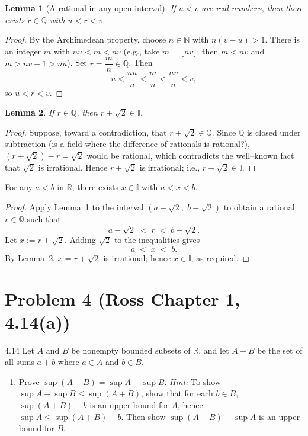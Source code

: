 \documentclass[12pt]{article}
\newtheorem{lemma}{Lemma}
\begin{document}
\begin{lemma}[A rational in any open interval]
\label{lem:densityQ}
If $u<v$ are real numbers, then there exists $r\in\mathbb{Q}$ with $u<r<v$.
\end{lemma}

\begin{proof}
By the Archimedean property, choose $n\in\mathbb{N}$ with $n(v-u)>1$.  
There is an integer $m$ with $nu<m<nv$ (e.g., take $m=\lfloor nv\rfloor$; then $m<nv$ and $m>nv-1>nu$).  
Set $r=\dfrac{m}{n}\in\mathbb{Q}$. Then
\[
u<\frac{nu}{n}<\frac{m}{n}<\frac{nv}{n}<v,
\]
so $u<r<v$.
\end{proof}

\begin{lemma}\label{lem:shift}
If $r\in\mathbb{Q}$, then $r+\sqrt2\in\mathbb{I}$.
\end{lemma}

\begin{proof}
Suppose, toward a contradiction, that $r+\sqrt2\in\mathbb{Q}$.  
Since $\mathbb{Q}$ is closed under subtraction (is a field where the difference of rationals is rational?), $(r+\sqrt2)-r=\sqrt2$ would be rational, which contradicts the well–known fact that $\sqrt2$ is irrational.  
Hence $r+\sqrt2$ is irrational; i.e., $r+\sqrt2\in\mathbb{I}$.
\end{proof}

For any $a<b$ in $\mathbb{R}$, there exists $x\in\mathbb{I}$ with $a<x<b$.

\begin{proof}
Apply Lemma~\ref{lem:densityQ} to the interval $(a-\sqrt2,\; b-\sqrt2)$ to obtain
a rational $r\in\mathbb{Q}$ such that
\[
a-\sqrt2 \;<\; r \;<\; b-\sqrt2.
\]
Let $x:=r+\sqrt2$.  Adding $\sqrt2$ to the inequalities gives
\[
a \;<\; x \;<\; b.
\]
By Lemma~\ref{lem:shift}, $x=r+\sqrt2$ is irrational; hence $x\in\mathbb{I}$, as required.
\end{proof}

\newpage

\section*{Problem 4 (Ross Chapter 1, 4.14(a))}

4.14 Let $A$ and $B$ be nonempty bounded subsets of $\mathbb{R}$, and let 
$A + B$ be the set of all sums $a + b$ where $a \in A$ and $b \in B$.  

\begin{enumerate}[label=\textbf{(\alph*)}]
  \item Prove $\sup(A+B) = \sup A + \sup B$. 
  \textit{Hint:} To show $\sup A + \sup B \le \sup(A+B)$, show that for each $b \in B$, 
  $\sup(A+B) - b$ is an upper bound for $A$, hence $\sup A \le \sup(A+B) - b$. 
  Then show $\sup(A+B) - \sup A$ is an upper bound for $B$. 
\end{enumerate}
\end{document}
